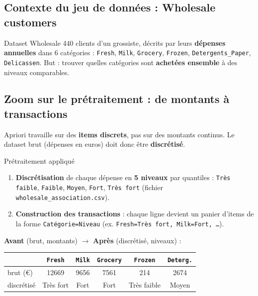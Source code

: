 \documentclass[11pt,a4paper]{article}
\begin{document}
\subsection{Contexte du jeu de données : Wholesale customers}

\begin{definition}{Dataset Wholesale}
440 clients d'un grossiste, décrits par leurs \textbf{dépenses annuelles} dans 6
catégories : \texttt{Fresh}, \texttt{Milk}, \texttt{Grocery}, \texttt{Frozen},
\texttt{Detergents\_Paper}, \texttt{Delicassen}. But : trouver quelles catégories
sont \textbf{achetées ensemble} à des niveaux comparables.
\end{definition}

\subsection{Zoom sur le prétraitement : de montants à transactions}

\begin{attention}
Apriori travaille sur des \textbf{items discrets}, pas sur des montants continus.
Le dataset brut (dépenses en euros) doit donc être \textbf{discrétisé}.
\end{attention}

\begin{regle}{Prétraitement appliqué}
\begin{enumerate}[leftmargin=*]
  \item \textbf{Discrétisation} de chaque dépense en \textbf{5 niveaux} par
        quantiles : \texttt{Très faible}, \texttt{Faible}, \texttt{Moyen},
        \texttt{Fort}, \texttt{Très fort} (fichier \texttt{wholesale\_association.csv}).
  \item \textbf{Construction des transactions} : chaque ligne devient un panier
        d'items de la forme \texttt{Catégorie=Niveau}
        (ex. \texttt{Fresh=Très fort, Milk=Fort, \ldots}).
\end{enumerate}
\end{regle}

\noindent \textbf{Avant} (brut, montants) $\rightarrow$ \textbf{Après}
(discrétisé, niveaux) :

\begin{center}\footnotesize
\begin{tabular}{@{}lccccc@{}}
\toprule
& \texttt{Fresh} & \texttt{Milk} & \texttt{Grocery} & \texttt{Frozen} & \texttt{Deterg.} \\
\midrule
brut (€) & 12669 & 9656 & 7561 & 214 & 2674 \\
discrétisé & Très fort & Fort & Fort & Très faible & Moyen \\
\bottomrule
\end{tabular}
\end{center}
\end{document}
